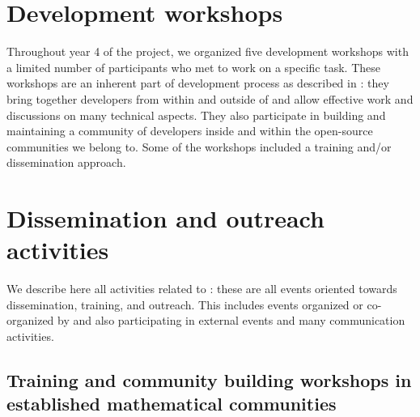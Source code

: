 \documentclass{deliverablereport}
\author{Viviane Pons et al.}
\begin{document}
\maketitle
\githubissuedescription
\newpage
\tableofcontents
\newpage

\section{Development workshops}

Throughout year 4 of the project, we organized five development
workshops with a limited number of participants who met to work on a
specific task. These workshops are an inherent part of \ODK
development process as described in :
they bring together developers from within and outside of \ODK and
allow effective work and discussions on many technical aspects. They
also participate in building and maintaining a community of developers
inside \ODK and within the open-source communities we belong to. Some
of the workshops included a training and/or dissemination approach.















\section{Dissemination and outreach activities}

We describe here all activities related to :
these are all events oriented towards dissemination, training, and outreach. This
includes events organized or co-organized by \ODK and also
participating in external events and many communication activities.

\subsection{Training and community building workshops in established mathematical communities}
\end{document}
